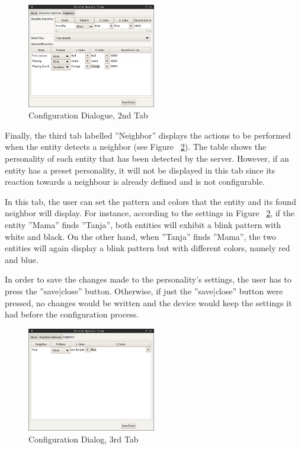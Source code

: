\begin{figure}[h!]
 \centering
 \includegraphics[width= 0.5\textwidth, clip=true  ,keepaspectratio=true]{./pic/java-server-config02.png}
 \caption{Configuration Dialogue, 2nd Tab}
 \label{fig:java-server-config02}
\end{figure}


Finally, the third tab labelled ''Neighbor'' displays the actions to be performed when the entity detects a neighbor (see Figure ~\ref{fig:java-server-config03}). The table shows the personality of each entity that has been detected by the server. However, if an entity has a preset personality, it will not be displayed in this tab since its reaction towards a neighbour is already defined and is not configurable. 

In this tab, the user can set the pattern and colors that the entity and its found neighbor will display. For instance, according to the settings in Figure ~\ref{fig:java-server-config03}, if the entity ''Mama'' finds ''Tanja'', both entities will exhibit a blink pattern with white and black. On the other hand, when ''Tanja'' finds ''Mama'', the two entities will again display a blink pattern but with different colors, namely red and blue. 

In order to save the changes made to the personality's settings, the user has to press the ''save|close'' button. Otherwise, if just the ''save|close'' button were pressed, no changes would be written and the device would keep the settings it had before the configuration process.

\begin{figure}[h!]
 \centering
 \includegraphics[width= 0.5\textwidth, clip=true  ,keepaspectratio=true]{./pic/java-server-config03.png}
 \caption{Configuration Dialog, 3rd Tab}
 \label{fig:java-server-config03}
\end{figure}

